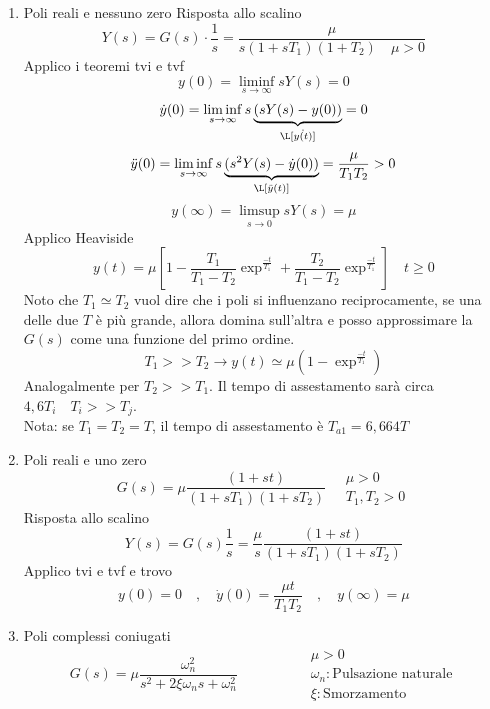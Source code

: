 	\begin{enumerate}
	  \item Poli reali e nessuno zero
		\subitem Risposta allo scalino
		\[Y(s) = G(s) \cdot \frac{1}{s} = \frac{\mu}{s(1+sT_1)(1+T_2) \quad \mu>0}\]
		Applico i teoremi \gls{tvi} e \gls{tvf}
		\[y(0) = \liminf_{s \to \infty} sY(s) = 0\]
		\[\dot{y}(0) = \liminf_{s \to \infty} s\underbrace{(sY(s) - y(0))}_{\L[\dot{y(t)}]} = 0 \]
		\[\ddot{y}(0) = \liminf_{s \to \infty} s\underbrace{(s^2Y(s) - \dot y(0))}_{\L[\ddot{y}(t)]} = \frac{\mu}{T_1 T_2}>0 \]
		\[y(\infty) = \limsup_{s \to 0} sY(s) = \mu\]
		Applico Heaviside
		\[y(t) = \mu \left[1 - \frac{T_1}{T_1 - T_2} \exp^{\frac{-t}{T_1}}+\frac{T_2}{T_1 - T_2} \exp^{\frac{-t}{T_1}}\right] \quad t\geq 0\]
		Noto che $T_1 \simeq T_2 $ vuol dire che i poli si influenzano reciprocamente, se una delle due $T$ è più grande, allora
		domina sull'altra e posso approssimare la $G(s)$ come una funzione del primo ordine.
		\begin{equation*}
		 T_1 >> T_2 \to y(t) \simeq \mu (1- \exp^{\frac{-t}{T_1}})
		\end{equation*}
		Analogalmente per $T_2 >> T_1$. Il tempo di assestamento sarà circa $4,6 T_i \quad T_i>>T_j$.\\
		Nota: se $T_1 =T_2 =T$, il tempo di assestamento è $T_{a1} = 6,664T$
		\item Poli reali e uno zero
		  \[G(s) = \mu \frac{(1+st)}{(1+sT_1)(1+sT_2)}\quad \begin{aligned}
			\mu >0\\
			T_1,T_2 >0
		  \end{aligned} \]
		  \subitem Risposta allo scalino
		  \[Y(s) = G(s) \frac{1}{s} = \frac{\mu}{s}\frac{(1+st)}{(1+sT_1)(1+sT_2)}\]
		  Applico \gls{tvi} e \gls{tvf} e trovo
		  \[y(0) = 0 \quad,\quad \dot y(0) = \frac{\mu t}{T_1T_2}\quad,\quad y(\infty) = \mu\]
		  \item Poli complessi coniugati
		\begin{equation*}
			G(s) = \mu \frac{\omega_n^2}{s^2 +2\xi\omega_ns +\omega_n^2}
			\qquad\qquad 
			\begin{aligned}
				&\mu >0\\
				&\omega_n: \text{Pulsazione naturale}\\
				&\xi: \text{Smorzamento}
			\end{aligned}

\end{equation*}
\end{enumerate}
